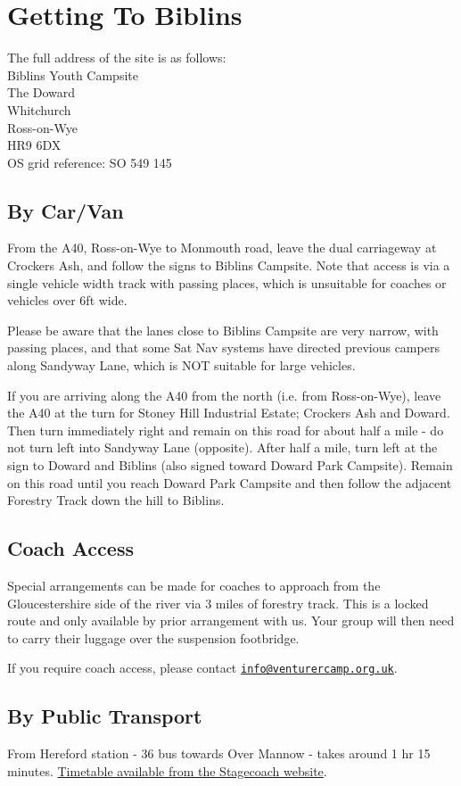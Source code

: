 \documentclass[a4paper, 11pt]{report}
\makeatletter
\newcommand{\nl}{\newline}
\newcommand{\infoemail}{\href{mailto:info@venturercamp.org.uk}{\texttt{info@venturercamp.org.uk}}}
\makeatother
\begin{document}
\chapter{Getting To Biblins}
The full address of the site is as follows:\\
Biblins Youth Campsite\\
The Doward\\
Whitchurch\\
Ross-on-Wye\\
HR9 6DX\\
OS grid reference: SO 549 145

\section{By Car/Van}
From the A40, Ross-on-Wye to Monmouth road, leave the dual carriageway at Crockers Ash, and follow the signs to Biblins Campsite. Note that access is via a single vehicle width track with passing places, which is unsuitable for coaches or vehicles over 6ft wide.\nl

Please be aware that the lanes close to Biblins Campsite are very narrow, with passing places, and that some Sat Nav systems have directed previous campers along Sandyway Lane, which is NOT suitable for large vehicles.\nl

If you are arriving along the A40 from the north (i.e. from Ross-on-Wye), leave the A40 at the turn for Stoney Hill Industrial Estate; Crockers Ash and Doward. Then turn immediately right and remain on this road for about half a mile - do not turn left into Sandyway Lane (opposite). After half a mile, turn left at the sign to Doward and Biblins (also signed toward Doward Park Campsite). Remain on this road until you reach Doward Park Campsite and then follow the adjacent Forestry Track down the hill to Biblins.

\section{Coach Access}
Special arrangements can be made for coaches to approach from the Gloucestershire side of the river via 3 miles of forestry track. This is a locked route and only available by prior arrangement with us. Your group will then need to carry their luggage over the suspension footbridge.\nl

If you require coach access, please contact \infoemail.

\section{By Public Transport}
From Hereford station - 36 bus towards Over Mannow - takes around 1 hr 15 minutes. \href{https://tiscon-maps-stagecoachbus.s3.amazonaws.com/Timetables/West/2022/36040922.pdf}{Timetable available from the Stagecoach website}.\nl
\end{document}
